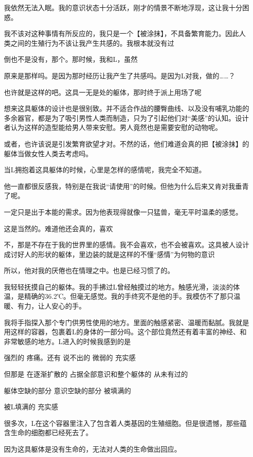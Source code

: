 我依然无法入眠。我的意识状态十分活跃，刚才的情景不断地浮现，这让我十分困惑。

我不该对这种事情有所反应的，我只是一个【被涂抹】，不具备繁育能力。因此人类之间的生殖行为不该让我产生共感的。我根本就没有过

倒也不是没有，那个。那时候，我和L，虽然

原来是那样吗。是因为那时经历让我产生了共感吗。是因为L对我，做的……？

也许就是这样的吧。这具一无是处的躯体，那时终于派上用场了呢

想来这具躯体的设计也是很别致。并不适合作战的腰臀曲线、以及没有哺乳功能的多余器官，都是为了吸引男性人类而制造，只为了引起他们对“美感”的认知。设计者认为这样的造型能给男人带来安慰。男人竟然也是需要安慰的动物呢。

或者，也许该说是引发繁育欲望才对。不然的话，他们难道会真的把【被涂抹】的躯体当做女性人类去考虑吗。

当L拥抱着这具躯体的时候，心里是怎样的感情呢，我完全不知道。

他一直都很反感我，特别是在我说“请使用”的时候。但他为什么后来又肯对我垂青了呢。

一定只是出于本能的需求。因为他表现得就像一只猛兽，毫无平时温柔的感觉。

这是当然的。难道他还会真的，喜欢

不，那是不存在于我的世界里的感情。我不会喜欢，也不会被喜欢。这具被人设计成讨好人的形状的躯体，里边装的就是这样的不懂“感情”为何物的意识

所以，他对我的厌倦也在情理之中。也是已经习惯了的。

我轻轻抚摸自己的躯体。我的手拂过L曾经触摸过的地方。触感光滑，淡淡的体温，是精确的36.2℃。但毫无感觉。我的手终究不是他的手。我模仿不了那只温暖、有力，让人安心的手。

我将手指探入那个专门供男性使用的地方。里面的触感紧密、温暖而黏腻。我就是用这样的容器，包裹着L的身体的一部分吗。这个部位竟然还有着丰富的神经、和非常敏感的地方。L进入的时候我感到的是

强烈的 疼痛。还有 说不出的 微弱的 充实感

但那是 在逐渐扩散的 占据全部意识和整个躯体的 从未有过的

躯体空缺的部分 意识空缺的部分 被填满的

被L填满的 充实感

很多次，L在这个容器里注入了包含着人类基因的生殖细胞。但是很遗憾，那些蕴含生命的细胞都已经死去了。

因为这具躯体是没有生命的，无法对人类的生命做出回应。

